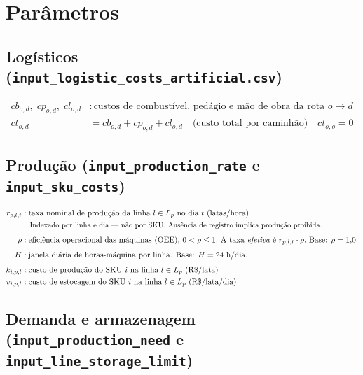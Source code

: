 \documentclass[12pt, a4paper]{article}
\begin{document}
\section{Par\^{a}metros}

\subsection*{Log\'{i}sticos \textnormal{\small(\texttt{input\_logistic\_costs\_artificial.csv})}}

\begin{align*}
  cb_{o,d},\; cp_{o,d},\; cl_{o,d} &: \text{custos de combust\'{i}vel, ped\'{a}gio e m\~{a}o de obra da rota } o \to d \\
  ct_{o,d} &= cb_{o,d} + cp_{o,d} + cl_{o,d} \quad \text{(custo total por caminh\~{a}o)} \quad ct_{o,o} = 0
\end{align*}

\subsection*{Produ\c{c}\~{a}o \textnormal{\small(\texttt{input\_production\_rate} e \texttt{input\_sku\_costs})}}

\begin{align*}
  r_{p,l,t}   &: \text{taxa nominal de produ\c{c}\~{a}o da linha } l \in L_p \text{ no dia } t \text{ (latas/hora)} \\
               &\quad \text{\small Indexado por linha e dia --- n\~{a}o por SKU. Aus\^{e}ncia de registro implica produ\c{c}\~{a}o proibida.} \\[4pt]
  \rho        &: \text{efici\^{e}ncia operacional das m\'{a}quinas (OEE), } 0 < \rho \leq 1.
                  \text{ A taxa \emph{efetiva} \'{e} } r_{p,l,t}\cdot\rho. \text{ Base: } \rho = 1{,}0. \\[4pt]
  H           &: \text{janela di\'{a}ria de horas-m\'{a}quina por linha. Base: } H = 24\text{ h/dia}. \\[4pt]
  k_{i,p,l}   &: \text{custo de produ\c{c}\~{a}o do SKU } i \text{ na linha } l \in L_p \text{ (R\$/lata)} \\
  v_{i,p,l}   &: \text{custo de estocagem do SKU } i \text{ na linha } l \in L_p \text{ (R\$/lata/dia)}
\end{align*}

\subsection*{Demanda e armazenagem \textnormal{\small(\texttt{input\_production\_need} e \texttt{input\_line\_storage\_limit})}}
\end{document}
